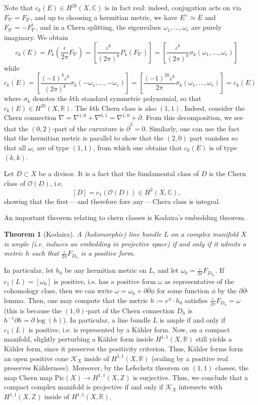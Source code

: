 \documentclass[11pt]{amsart}
\newcommand{\cK}{\mathcal{K}}
\newcommand{\cO}{\mathcal{O}}
\newcommand{\Z}{\mathbb Z}
\newcommand{\R}{\mathbb R}
\newcommand{\C}{\mathbb C}
\newcommand{\brk}[1]{\!\left[#1\right]}
\newtheorem{theorem}{Theorem}[subsection]
\theoremstyle{definition}
\numberwithin{equation}{section}
\begin{document}
Note that $c_k(E)\in H^{2k}(X,\C)$ is in fact real: indeed, conjugation acts on via $\overline{F_\nabla}=F_{\overline\nabla}$, and up to choosing a hermitian metric, we have $E^\vee\simeq \overline E$ and $F_{\overline\nabla}=-F_\nabla^t$, and in a Chern splitting, the eigenvalues $\omega_1,\dots,\omega_r$ are purely imaginary. We obtain
\[c_k(E)=P_k(\frac{\iota}{2\pi}F_\nabla)=\brk{\frac{\iota^k}{(2\pi)^k}P_k(F_\nabla)}=\brk{\frac{\iota^k}{(2\pi)^k}\sigma_k(\omega_1,\dots,\omega_r)}
\]
while
\[
\overline{c_k(E)}=\brk{\frac{(-1)^k\iota ^k}{(2\pi)^k}\sigma_k(-\omega_1,\dots,-\omega_r)}=\brk{\frac{(-1)^{2k}\iota^k}{2\pi}\sigma_k(\omega_1,\dots,\omega_r)}=c_k(E)
\]
where $\sigma_k$ denotes the $k$th standard symmetric polynomial, so that $c_k(E)\in H^{2k}(X,\R)$. The $k$th Chern class is also $(1,1)$. Indeed, consider the Chern connection $\nabla=\nabla^{1,0}+\nabla^{0,1}=\nabla^{1,0}+\overline\partial$. From this decomposition, we see that the $(0,2)$-part of the curvature is $\overline\partial^2=0$. Similarly, one can use the fact that the hermitian metric is parallel to show that the $(2,0)$ part vanishes so that all $\omega_i$ are of type $(1,1)$, from which one obtains that $c_k(E)$ is of type $(k,k)$.

Let $D\subset X$ be a divisor. It is a fact that the fundamental class of $D$ is the Chern class of $\cO(D)$, i.e.
\[
[D]=c_1(\cO(D))\in H^{2}(X,\C),
\]
showing that the first\,---\,and therefore fore any\,---\,Chern class is integral.

An important theorem relating to chern classes is Kodaira's embedding theorem.
\begin{theorem}[Kodaira]
	A (holomorphic) line bundle $L$ on a complex manifold $X$ is ample (i.e. induces an embedding in projective space) if and only if it admits a metric $h$ such that $\frac{\iota}{2\pi}F_{D_h}$ is a positive form.
\end{theorem}
In particular, let $h_0$ be any hermitian metric on $L$, and let $\omega_0=\frac{\iota}{2\pi}F_{D_{h_0}}$. If $c_1(L)=[\omega_0]$ is positive, i.e. has a positive form $\omega$ as representative of the cohomology class, then we can write $\omega=\omega_0+\partial\overline\partial\phi$ for some function $\phi$ by the $\partial\overline\partial$-lemma. Then, one may compute that the metric $h:=e^{\phi}\cdot h_0$ satisfies $\frac{\iota}{2\pi}F_{D_h}=\omega$ (this is because the $(1,0)$-part of the Chern connection $D_h$ is $h^{-1}\partial h=\partial\log(h)$). In particular, a line bundle $L$ is ample if and only if $c_1(L)$ is positive, i.e. is represented by a Kähler form. Now, on a compact manifold, slightly perturbing a Kähler form inside $H^{1,1}(X,\R)$ still yields a Kähler form, since it preserves the positivity criterion. Thus, Kähler forms form an open positive cone $\cK_X$ inside of $H^{1,1}(X,\R)$ (scaling by a positive real preserves Kählerness). Moreover, by the Lefschetz theorem on $(1,1)$ classes, the map Chern map $\text{Pic}(X) \to H^{1,1}(X,\Z)$ is surjective.  Thus, we conclude that a compact complex manifold is projective if and only if $\cK_X$ intersects with $H^{1,1}(X,\Z)$ inside of $H^{1,1}(X,\R)$.
\end{document}
